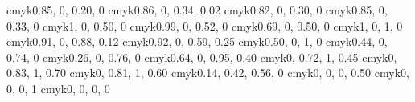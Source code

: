 \definecolor{turquoise}     {cmyk}{0.85, 0, 0.20, 0   }
\definecolor{tealblue}      {cmyk}{0.86, 0, 0.34, 0.02}
\definecolor{aquamarine}    {cmyk}{0.82, 0, 0.30, 0   }
\definecolor{bluegreen}     {cmyk}{0.85, 0, 0.33, 0   }
\definecolor{emerald}       {cmyk}{1, 0, 0.50, 0   }
\definecolor{junglegreen}   {cmyk}{0.99, 0, 0.52, 0   }
\definecolor{seagreen}      {cmyk}{0.69, 0, 0.50, 0   }
\definecolor{green}         {cmyk}{1, 0, 1, 0   }
\definecolor{forestgreen}   {cmyk}{0.91, 0, 0.88, 0.12}
\definecolor{pinegreen}     {cmyk}{0.92, 0, 0.59, 0.25}
\definecolor{limegreen}     {cmyk}{0.50, 0, 1, 0   }
\definecolor{yellowgreen}   {cmyk}{0.44, 0, 0.74, 0   }
\definecolor{springgreen}   {cmyk}{0.26, 0, 0.76, 0   }
\definecolor{olivegreen}    {cmyk}{0.64, 0, 0.95, 0.40}
\definecolor{rawsienna}     {cmyk}{0, 0.72, 1, 0.45}
\definecolor{sepia}         {cmyk}{0, 0.83, 1, 0.70}
\definecolor{brown}         {cmyk}{0, 0.81, 1, 0.60}
\definecolor{tan}           {cmyk}{0.14, 0.42, 0.56, 0   }
\definecolor{gray}          {cmyk}{0, 0, 0, 0.50}
\definecolor{black}         {cmyk}{0, 0, 0, 1   }
\definecolor{white}         {cmyk}{0, 0, 0, 0   }

\settypeblocksize{8in}{5.25in}{*} %


\setheadfoot{\onelineskip}{2\onelineskip}
\setheaderspaces{*}{2\onelineskip}{*}

\def\baselinestretch{1.1}

\checkandfixthelayout


\pagestyle{ruled}





\newcommand{\kbz}{{k_{\mathrm{B}}}}

\renewcommand{\vec}{\mathbf}

\newcommand{\VMC}{\textbf{VMC}}
\newcommand{\QMC}{\textbf{QMC}}
\newcommand{\DFT}{\textbf{DFT}}
\newcommand{\GP}{Gross-Pitaevskii}

